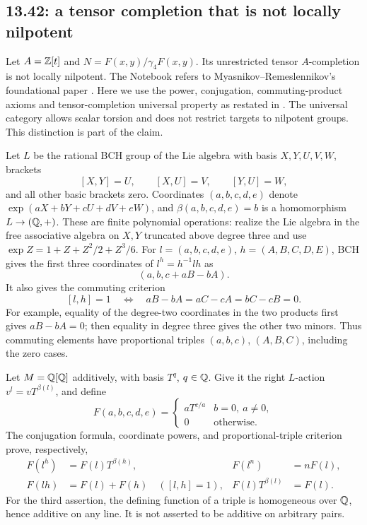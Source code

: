 \subsection{13.42: a tensor completion that is not locally nilpotent}
\label{cand:13.42}
Let \(A=\mathbb Z[t]\) and \(N=F(x,y)/\gamma_4F(x,y)\).
Its unrestricted tensor \(A\)-completion is not locally nilpotent.
The Notebook refers to Myasnikov--Remeslennikov's foundational paper
\cite{exponential-groups-1}. Here we use the power, conjugation,
commuting-product axioms and tensor-completion universal property
as restated in \cite[Definitions~1--2]{exponential-groups}.
The universal category allows scalar torsion and does not restrict
targets to nilpotent groups. This distinction is part of the claim.

Let \(L\) be the rational BCH group of the Lie algebra with basis
\(X,Y,U,V,W\), brackets
\[
 [X,Y]=U,\qquad [X,U]=V,\qquad [Y,U]=W,
\]
and all other basic brackets zero.
Coordinates \((a,b,c,d,e)\) denote
\(\exp(aX+bY+cU+dV+eW)\), and \(\beta(a,b,c,d,e)=b\) is a
homomorphism \(L\to(\mathbb Q,+)\).
These are finite polynomial operations: realize the Lie algebra in
the free associative algebra on \(X,Y\) truncated above degree three
and use \(\exp Z=1+Z+Z^2/2+Z^3/6\).
For \(l=(a,b,c,d,e)\), \(h=(A,B,C,D,E)\), BCH gives the first
three coordinates of \(l^h=h^{-1}lh\) as
\[
 (a,b,c+aB-bA).
\]
It also gives the commuting criterion
\[
 [l,h]=1\quad\Longleftrightarrow\quad
 aB-bA=aC-cA=bC-cB=0.
\]
For example, equality of the degree-two coordinates in the two
products first gives \(aB-bA=0\); then equality in degree three
gives the other two minors. Thus commuting elements have proportional
triples \((a,b,c)\), \((A,B,C)\), including the zero cases.

Let \(M=\mathbb Q[\mathbb Q]\) additively, with basis \(T^q\), \(q\in\mathbb Q\).
Give it the right \(L\)-action \(v^l=vT^{\beta(l)}\), and define
\[
 F(a,b,c,d,e)=
 \begin{cases}aT^{c/a}&b=0,\ a\ne0,\\0&\text{otherwise}.\end{cases}
\]
The conjugation formula, coordinate powers, and proportional-triple
criterion prove, respectively,
\[
 \begin{aligned}
 F(l^h)&=F(l)T^{\beta(h)},&
 F(l^n)&=nF(l),\\
 F(lh)&=F(l)+F(h)\quad([l,h]=1),&
 F(l)T^{\beta(l)}&=F(l).
 \end{aligned}
\]
For the third assertion, the defining function of a triple is
homogeneous over \(\mathbb Q\), hence additive on any line.
It is not asserted to be additive on arbitrary pairs.

